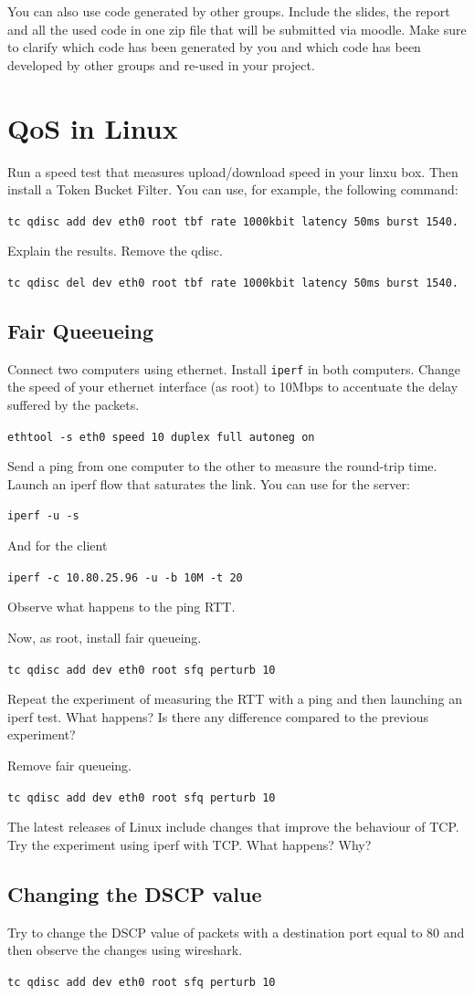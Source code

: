 You can also use code generated by other groups.
Include the slides, the report and all the used code in one zip file that will be submitted via moodle.
Make sure to clarify which code has been generated by you and which code has been developed by other groups and re-used in your project.

\section{QoS in Linux}

Run a speed test that measures upload/download speed in your linxu box. 
Then install a Token Bucket Filter.
You can use, for example, the following command:

\texttt{tc qdisc add dev eth0 root tbf rate 1000kbit latency 50ms burst 1540.}

Explain the results.
Remove the qdisc.

\texttt{tc qdisc del dev eth0 root tbf rate 1000kbit latency 50ms burst 1540.}

\subsection{Fair Queeueing}

Connect two computers using ethernet.
Install \texttt{iperf} in both computers.
Change the speed of your ethernet interface (as root) to 10Mbps to accentuate the delay suffered by the packets.

\texttt{ethtool -s eth0 speed 10 duplex full autoneg on}

Send a ping from one computer to the other to measure the round-trip time.
Launch an iperf flow that saturates the link.
You can use for the server:

\texttt{iperf -u -s}

And for the client

\texttt{iperf -c 10.80.25.96 -u -b 10M -t 20}

Observe what happens to the ping RTT.

Now, as root, install fair queueing.

\texttt{tc qdisc add dev eth0 root sfq perturb 10}

Repeat the experiment of measuring the RTT with a ping and then launching an iperf test.
What happens?
Is there any difference compared to the previous experiment?

Remove fair queueing.

\texttt{tc qdisc add dev eth0 root sfq perturb 10}

The latest releases of Linux include changes that improve the behaviour of TCP.
Try the experiment using iperf with TCP.
What happens? Why?

\subsection{Changing the DSCP value}

Try to change the DSCP value of packets with a destination port equal to 80 and then observe the changes using wireshark.

\texttt{tc qdisc add dev eth0 root sfq perturb 10}
